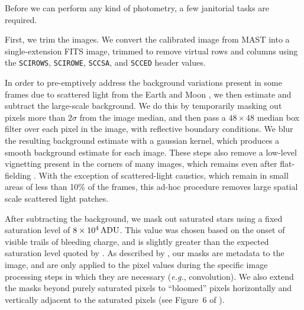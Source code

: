 \documentclass[12pt,twocolumn,tighten]{aastex62}
\begin{document}
Before we can perform any kind of photometry, a few janitorial tasks
are required.

First, we trim the images.  We convert the calibrated image from MAST
into a single-extension FITS image, trimmed to remove virtual rows and
columns using the \texttt{SCIROWS}, \texttt{SCIROWE}, \texttt{SCCSA},
and \texttt{SCCED} header values.

In order to pre-emptively address the background
variations present in some frames due to scattered light from the
Earth and Moon \citep[see][\S 7.3.1--7.3.4]{vanderspek_2018},
we then estimate and subtract the large-scale background.
We do this by
temporarily masking out pixels more than $2\sigma$ from the image median,
and then pass a $48\times48$ median box filter over each pixel in
the image, with reflective boundary conditions. 
We blur the resulting background estimate with a gaussian kernel,
which produces a
smooth background estimate for each image.  These steps also remove
a low-level vignetting
present in the corners of many images, which remains even after
flat-fielding \citep[see][\S 7.3.5]{vanderspek_2018}.
With the exception of scattered-light caustics, which remain in small
areas of less than 10\% of the frames, this ad-hoc procedure removes
large spatial scale scattered light patches.


After subtracting the background, we mask out saturated stars using a
fixed saturation level of $8\times10^4\,{\rm ADU}$. This value was
chosen based on the onset of visible trails of bleeding charge, and is
slightly greater than the expected saturation level quoted by
\citet{vanderspek_2018}.  As described by \citet{Pal_2009}, our masks
are metadata to the image, and are only applied to the
pixel values during the specific image processing steps in which they
are necessary ({\it e.g.}, convolution). We also extend the masks
beyond purely saturated pixels to ``bloomed'' pixels horizontally and
vertically adjacent to the saturated pixels (see Figure~6 of \citealt{Pal_2009}).
\end{document}
